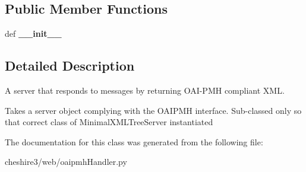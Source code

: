 \subsection*{Public Member Functions}
\begin{DoxyCompactItemize}
\item 
\hypertarget{classcheshire3_1_1web_1_1oaipmh_handler_1_1_minimal_oai_server_a60a12f098af92574f211d5972c98733a}{def {\bfseries \-\_\-\-\_\-init\-\_\-\-\_\-}}\label{classcheshire3_1_1web_1_1oaipmh_handler_1_1_minimal_oai_server_a60a12f098af92574f211d5972c98733a}

\end{DoxyCompactItemize}


\subsection{Detailed Description}
\begin{DoxyVerb}A server that responds to messages by returning OAI-PMH compliant XML.

Takes a server object complying with the OAIPMH interface.
Sub-classed only so that correct class of MinimalXMLTreeServer instantiated
\end{DoxyVerb}
 

The documentation for this class was generated from the following file\-:\begin{DoxyCompactItemize}
\item 
cheshire3/web/oaipmh\-Handler.\-py\end{DoxyCompactItemize}
